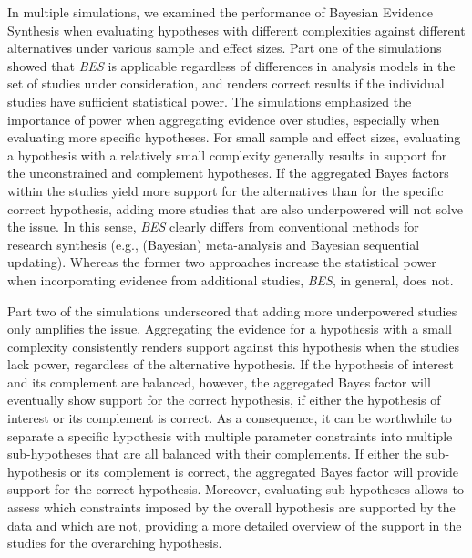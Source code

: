 \documentclass[
  authoryear,
  preprint,
  5p,
  twocolumn]{elsarticle}
\begin{document}
In multiple simulations, we examined the performance of Bayesian
Evidence Synthesis when evaluating hypotheses with different
complexities against different alternatives under various sample and
effect sizes. Part one of the simulations showed that \emph{BES} is
applicable regardless of differences in analysis models in the set of
studies under consideration, and renders correct results if the
individual studies have sufficient statistical power. The simulations
emphasized the importance of power when aggregating evidence over
studies, especially when evaluating more specific hypotheses. For small
sample and effect sizes, evaluating a hypothesis with a relatively small
complexity generally results in support for the unconstrained and
complement hypotheses. If the aggregated Bayes factors within the
studies yield more support for the alternatives than for the specific
correct hypothesis, adding more studies that are also underpowered will
not solve the issue. In this sense, \emph{BES} clearly differs from
conventional methods for research synthesis (e.g., (Bayesian)
meta-analysis and Bayesian sequential updating). Whereas the former two
approaches increase the statistical power when incorporating evidence
from additional studies, \emph{BES}, in general, does not.

Part two of the simulations underscored that adding more underpowered
studies only amplifies the issue. Aggregating the evidence for a
hypothesis with a small complexity consistently renders support against
this hypothesis when the studies lack power, regardless of the
alternative hypothesis. If the hypothesis of interest and its complement
are balanced, however, the aggregated Bayes factor will eventually show
support for the correct hypothesis, if either the hypothesis of interest
or its complement is correct. As a consequence, it can be worthwhile to
separate a specific hypothesis with multiple parameter constraints into
multiple sub-hypotheses that are all balanced with their complements. If
either the sub-hypothesis or its complement is correct, the aggregated
Bayes factor will provide support for the correct hypothesis. Moreover,
evaluating sub-hypotheses allows to assess which constraints imposed by
the overall hypothesis are supported by the data and which are not,
providing a more detailed overview of the support in the studies for the
overarching hypothesis.
\end{document}
